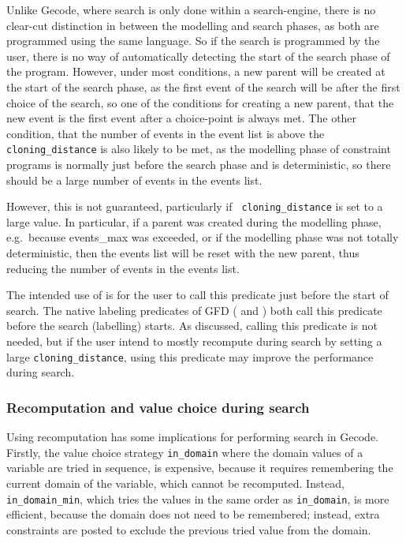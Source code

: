 Unlike Gecode, where search is only done within a search-engine, there
 is no clear-cut distinction in \eclipse between the modelling and
 search phases, as both are programmed using the same language. So if
the search is programmed by the user, 
there is no way of automatically detecting the start of the search
 phase of the program. However, under most conditions, a
 new  parent will be created
at the start of the search phase, as the first event of the search will be
after the first choice of the search, so one of the conditions for
 creating a new parent, that the new event
is the first event after a choice-point is always met. The other condition,
that the number of events in the event list is above the 
{\tt cloning_distance} is also likely to be met,  
as the modelling phase of constraint programs is normally just before
the search phase and is deterministic, so there should be a large
 number of events in the events list.

However, this is not guaranteed, particularly if {\tt
 cloning_distance} is set to 
a large value. In particular, if a parent was created  during the
modelling phase, e.g.\ because events_max was exceeded, or if the
 modelling phase was not totally deterministic, then the events list
 will be reset with the new parent, thus reducing the number of events
 in the events list. 

The intended use of  is for the user to call
this predicate just before the start of search. The native labeling predicates
of GFD ( and 
) both call this predicate before the
search (labelling) starts. As discussed, calling this predicate is not needed,
but if the user intend to mostly recompute during search by setting a
large {\tt cloning_distance}, using this predicate may improve the
 performance during search.

\subsubsection{Recomputation and value choice during search}

Using recomputation has some implications for performing search in 
Gecode.
Firstly, the value choice strategy {\tt in_domain} where the domain values
of a variable are tried in sequence, is expensive, because it requires 
remembering the current domain of the variable, which cannot be recomputed. 
Instead, {\tt in_domain_min}, which tries the values in the same order as 
{\tt in_domain}, is more efficient, because the domain does not need to 
be remembered; instead, extra constraints are posted to exclude the previous
tried value from the domain. 

